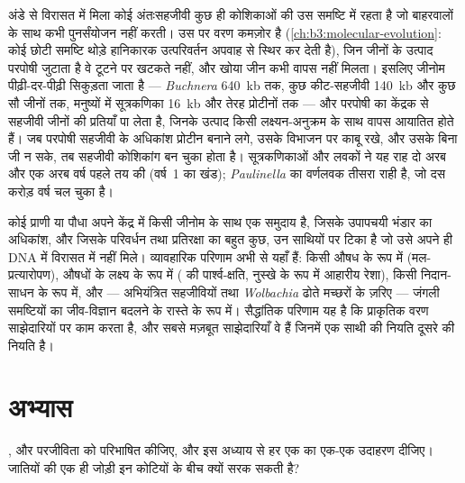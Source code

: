 \begin{proposition}[जीनोम-संकुचन और कोशिकांग तक की राह]\label{prop:b3:microbiomes:reduction}
अंडे से विरासत में मिला कोई अंतःसहजीवी कुछ ही कोशिकाओं की उस समष्टि में
रहता है जो बाहरवालों के साथ कभी पुनर्संयोजन नहीं करती। उस पर वरण कमज़ोर
है (\cref{ch:b3:molecular-evolution}: कोई छोटी समष्टि थोड़े हानिकारक
उत्परिवर्तन अपवाह से स्थिर कर देती है), जिन जीनों के उत्पाद परपोषी
जुटाता है वे टूटने पर खटकते नहीं, और खोया जीन कभी वापस नहीं मिलता।
इसलिए जीनोम पीढ़ी-दर-पीढ़ी सिकुड़ता जाता है --- \emph{Buchnera}
\qty{640}{kb} तक, कुछ कीट-सहजीवी \qty{140}{kb} और कुछ सौ जीनों तक,
मनुष्यों में सूत्रकणिका \qty{16}{kb} और तेरह प्रोटीनों तक --- और
परपोषी का केंद्रक \emph{} से सहजीवी जीनों की
प्रतियाँ पा लेता है, जिनके उत्पाद किसी लक्ष्यन-अनुक्रम के साथ वापस
आयातित होते हैं। जब परपोषी सहजीवी के अधिकांश प्रोटीन बनाने लगे, उसके
विभाजन पर काबू रखे, और उसके बिना जी न सके, तब सहजीवी कोशिकांग बन चुका
होता है। सूत्रकणिकाओं और लवकों ने यह राह दो अरब और एक अरब वर्ष पहले
तय की (वर्ष~1 का खंड); \emph{Paulinella} का वर्णलवक तीसरा राही है, जो
दस करोड़ वर्ष चल चुका है।
\end{proposition}

\begin{remark}[व्यष्टि पर फिर से]\label{rem:b3:microbiomes:individual}
कोई प्राणी या पौधा अपने केंद्र में किसी जीनोम के साथ एक समुदाय है,
जिसके उपापचयी भंडार का अधिकांश, और जिसके परिवर्धन तथा प्रतिरक्षा का
बहुत कुछ, उन साथियों पर टिका है जो उसे अपने ही DNA में विरासत में नहीं
मिले। व्यावहारिक परिणाम अभी से यहाँ हैं:  किसी औषध के रूप
में (मल-प्रत्यारोपण), औषधों के लक्ष्य के रूप में ( की
पार्श्व-क्षति, नुस्खे के रूप में आहारीय रेशा), किसी निदान-साधन के रूप
में, और --- अभियंत्रित सहजीवियों तथा \emph{Wolbachia} ढोते मच्छरों के
ज़रिए --- जंगली समष्टियों का जीव-विज्ञान बदलने के रास्ते के रूप में।
सैद्धांतिक परिणाम यह है कि प्राकृतिक वरण साझेदारियों पर काम करता है,
और सबसे मज़बूत साझेदारियाँ वे हैं जिनमें एक साथी की नियति दूसरे की
नियति है।
\end{remark}

\section{अभ्यास}

\begin{exercise}[$\star$]\label{exo:b3:microbiomes:1}
,  और परजीविता को परिभाषित कीजिए, और इस अध्याय से हर
एक का एक-एक उदाहरण दीजिए। जातियों की एक ही जोड़ी इन कोटियों के बीच
क्यों सरक सकती है?
\end{exercise}

